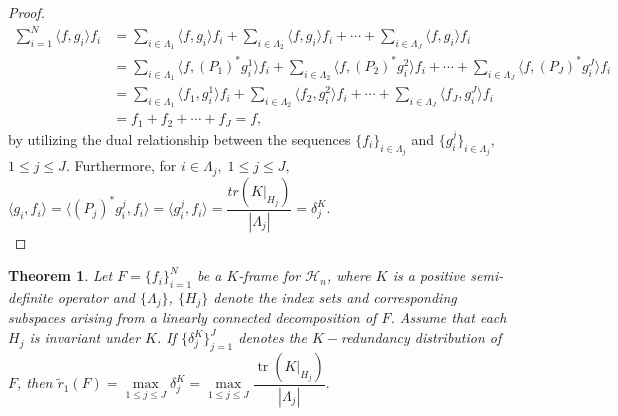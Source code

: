 \documentclass[final,1p,times]{elsarticle}
\newtheorem{thm}{Theorem}[section]
\begin{document}
\begin{proof}
\begin{align*}
	\sum_{i=1}^N \langle f,g_i \rangle f_i &=   \sum_{i \in \Lambda_1} \langle f,g_i \rangle f_i +  \sum_{i \in \Lambda_2} \langle f,g_i \rangle f_i + \cdots + \sum_{i \in \Lambda_J} \langle f,g_i \rangle f_i \\&=  \sum_{i \in \Lambda_1} \langle f,{(P_1)}^*g^1_i \rangle f_i +  \sum_{i \in \Lambda_2} \langle f,{(P_2)}^*g^2_i \rangle f_i + \cdots + \sum_{i \in \Lambda_J} \langle f,{(P_J)}^*g^J_i \rangle f_i  \\&=
	\sum_{i \in \Lambda_1} \langle f_1,g^1_i \rangle f_i +  \sum_{i \in \Lambda_2} \langle f_2,g^2_i \rangle f_i + \cdots + \sum_{i \in \Lambda_J} \langle f_J,g^J_i \rangle f_i \\&= f_1+f_2+\cdots +f_J = f,
\end{align*}
by utilizing the dual relationship between the sequences $\{f_i\}_{i \in \Lambda_j}$ and $\{g^j_i\}_{i \in \Lambda_j},$  $1 \leq j \leq J$. Furthermore, for $i \in \Lambda_j,\;1 \leq j \leq J,$ $\langle g_i,f_i \rangle =  \langle (P_j)^* g^j_i, f_i \rangle =  \langle g^j_i,f_i \rangle =  \dfrac{tr(K|_{H_j})}{|\Lambda_j|}= \delta_{j}^K.$ \\

\end{proof}





	
	\begin{thm}
Let $F = \{f_i\}_{i=1}^N$ be a $K$-frame for $\mathcal{H}_n$, where $K$ is a positive semi-definite operator and $\{\Lambda_j\}$, $\{H_j\}$ denote the index sets and corresponding subspaces arising from a linearly connected decomposition of $F$. Assume that each $H_j$ is invariant under $K$. If $\{\delta_{j}^K\}_{j=1}^J$ denotes the $K-$redundancy distribution of $F$, then $\tilde{r}_{1}(F) = \max\limits_{1 \leq j \leq J} \delta_{j}^K = \max\limits_{1 \leq j \leq J} \dfrac{\operatorname{tr}(K|_{H_j})}{|\Lambda_j|}.$
\end{thm}
\end{document}
